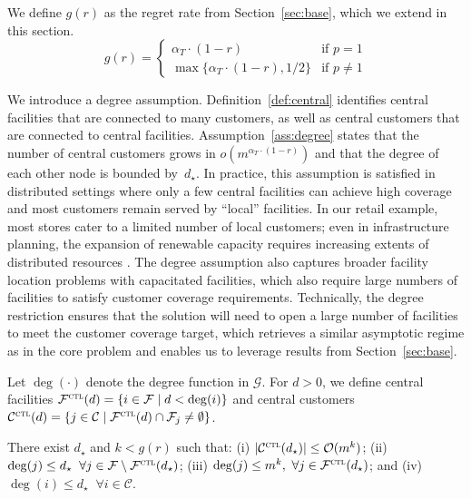 \documentclass[nonblindrev]{informs3noheader}
\def\calC{\mathcal{C}}
\def\calF{\mathcal{F}}
\def\calG{\mathcal{G}}
\def\calO{\mathcal{O}}
\begin{document}
We define $g(r)$ as the regret rate from Section~\ref{sec:base}, which we extend in this section.
\[g(r) = \begin{cases}
   	\alpha_T\cdot (1-r) & \text{if }p =1\\
   	\max\{\alpha_T\cdot (1-r),1/2\} & \text{if }p \neq 1
   \end{cases}\] 

We introduce a degree assumption. Definition~\ref{def:central} identifies central facilities that are connected to many customers, as well as central customers that are connected to central facilities. Assumption~\ref{ass:degree} states that the number of central customers grows in $o\left(m^{\alpha_T\cdot(1-r)}\right)$ and that the degree of each other node is bounded by~$d_\star$. In practice, this assumption is satisfied in distributed settings where only a few central facilities can achieve high coverage and most customers remain served by ``local'' facilities. In our retail example, most stores cater to a limited number of local customers; even in infrastructure planning, the expansion of renewable capacity requires increasing extents of distributed resources \citep{national2021accelerating}. The degree assumption also captures broader facility location problems with capacitated facilities, which also require large numbers of facilities to satisfy customer coverage requirements. Technically, the degree restriction ensures that the solution will need to open a large number of facilities to meet the customer coverage target, which retrieves a similar asymptotic regime as in the core problem and enables us to leverage results from Section~\ref{sec:base}.

\begin{definition}\label{def:central}
    Let $\deg(\cdot)$ denote the degree function in $\calG$. For $d>0$, we define central facilities $\calF^{\textsc{ctl}}(d)=\{i\in\calF \mid d< \deg(i)\}$ and central customers $\calC^{\textsc{ctl}}(d)= \{j\in\calC \mid \calF^{\textsc{ctl}}(d)\cap\calF_j\neq\emptyset\}$.
\end{definition}

\begin{assumption}[Degree]\label{ass:degree}
There exist $d_\star$ and $k <g(r)$ such that: (i) $|\calC^{\textsc{ctl}}(d_\star)|\leq \calO(m^k)$; (ii) $\deg(j)\leq d_\star \;\;\forall j \in \calF\setminus\calF^{\textsc{ctl}}(d_\star)$; (iii) $\deg(j)\leq m^k,\ \forall j\in\calF^{\textsc{ctl}}(d_\star)$; and (iv) $\deg(i)\leq d_\star \;\;\forall i \in \calC$.
\end{assumption}
\end{document}
